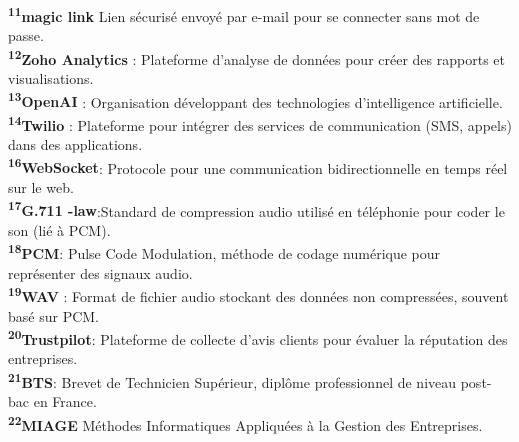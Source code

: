 \begin{small}
    \textbf{\textsuperscript{11}magic link} Lien sécurisé envoyé par e-mail pour se connecter sans mot de passe.\\\vspace{0.3cm}
   \textbf{\textsuperscript{12}Zoho Analytics }: Plateforme d'analyse de données pour créer des rapports et visualisations.\\\vspace{0.3cm}
      \textbf{\textsuperscript{13}OpenAI }:  Organisation développant des technologies d'intelligence artificielle.\\\vspace{0.3cm}
      \textbf{\textsuperscript{14}Twilio }: Plateforme pour intégrer des services de communication (SMS, appels) dans des applications.\\\vspace{0.3cm}
     \textbf{\textsuperscript{16}WebSocket}: Protocole pour une communication bidirectionnelle en temps réel sur le web.\\\vspace{0.3cm}
     \textbf{\textsuperscript{17}G.711 \textmu-law}:Standard de compression audio utilisé en téléphonie pour coder le son (lié à PCM).\\\vspace{0.3cm}
     \textbf{\textsuperscript{18}PCM}: Pulse Code Modulation, méthode de codage numérique pour représenter des signaux audio.\\\vspace{0.3cm}
    \textbf{\textsuperscript{19}WAV} : Format de fichier audio stockant des données non compressées, souvent basé sur PCM.\\\vspace{0.3cm}
    \textbf{\textsuperscript{20}Trustpilot}: Plateforme de collecte d'avis clients pour évaluer la réputation des entreprises.\\\vspace{0.3cm}
     \textbf{\textsuperscript{21}BTS}: Brevet de Technicien Supérieur, diplôme professionnel de niveau post-bac en France. \\\vspace{0.3cm}
     \textbf{\textsuperscript{22}MIAGE} Méthodes Informatiques Appliquées à la Gestion des Entreprises. \\\vspace{0.3cm}


\end{small}

